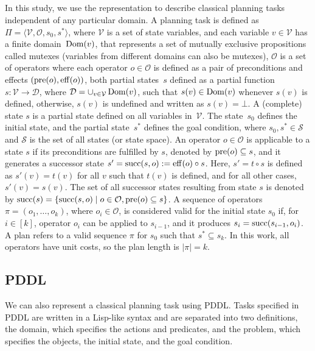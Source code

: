 \documentclass[ppgc,diss,english]{iiufrgs}
\begin{document}
\subsection{\sas}
\label{sec:background-sas}
In this study, we use the \sas representation to describe classical planning tasks independent of any particular domain. A \sas planning task is defined as $\Pi=\langle\mathcal{V},\mathcal{O},s_0,s^*\rangle$, where $\mathcal{V}$ is a set of state variables, and each variable $v\in \mathcal{V}$ has a finite domain~$\operatorname{Dom}(v)$, that represents a set of mutually exclusive propositions called mutexes (variables from different domains can also be mutexes), $\mathcal{O}$ is a set of operators where each operator $o \in \mathcal{O}$ is defined as a pair of preconditions and effects $(\operatorname{pre}(o),\operatorname{eff}(o))$, both partial states~$s$ defined as a partial function $s:\mathcal{V}\rightarrow \mathcal{D}$, where $\mathcal{D}=\cup_{v\in \mathcal{V}}\operatorname{Dom}(v)$, such that $s(v)\in \operatorname{Dom}(v)$ whenever $s(v)$ is defined, otherwise, $s(v)$ is undefined and written as $s(v)=\bot$.  A (complete) state $s$ is a partial state defined on all variables in~$\mathcal{V}$. The state~$s_0$ defines the initial state, and the partial state~$s^*$ defines the goal condition, where $s_0, s^* \in \mathcal{S}$ and $\mathcal{S}$ is the set of all states (or state space).
An operator $o \in \mathcal{O}$ is applicable to a state $s$ if its preconditions are fulfilled by $s$, denoted by $\operatorname{pre}(o) \subseteq s$, and it generates a successor state $s'=\operatorname{succ}(s,o):=\operatorname{eff}(o)\circ s$. Here, $s'=t\circ s$ is defined as $s'(v)=t(v)$ for all $v$ such that $t(v)$ is defined, and for all other cases, $s'(v)=s(v)$. The set of all successor states resulting from state $s$ is denoted by $\operatorname{succ}(s)=\{{\operatorname{succ}(s,o)\mid o\in \mathcal{O}, \operatorname{pre}(o) \subseteq s}\}$. A sequence of operators $\pi=(o_1,\ldots,o_k)$, where $o_i\in \mathcal{O}$, is considered valid for the initial state $s_0$ if, for $i\in[k]$, operator $o_i$ can be applied to $s_{i-1}$, and it produces $s_i=\operatorname{succ}(s_{i-1},o_i)$. A plan refers to a valid sequence $\pi$ for $s_0$ such that $s^* \subseteq s_k$. In this work, all operators have unit costs, so the plan length is $|\pi| = k$.

\subsection{PDDL}
\label{sec:background-pddl}
We can also represent a classical planning task using PDDL. Tasks specified in PDDL are written in a Lisp-like syntax and are separated into two definitions, the domain, which specifies the actions and predicates, and the problem, which specifies the objects, the initial state, and the goal condition.
\end{document}
